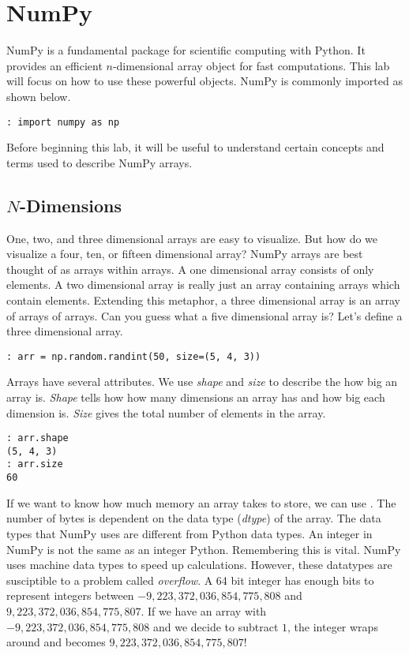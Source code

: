 \label{lab:Essentials2}


\section*{NumPy}
NumPy is a fundamental package for scientific computing with Python.  It provides an efficient $n$-dimensional array object for fast computations.  This lab will focus on how to use these powerful objects.  NumPy is commonly imported as shown below.

\begin{lstlisting}
: import numpy as np
\end{lstlisting}

Before beginning this lab, it will be useful to understand certain concepts and terms used to describe NumPy arrays.

\subsection*{$N$-Dimensions}
One, two, and three dimensional arrays are easy to visualize.  But how do we visualize a four, ten, or fifteen dimensional array?  NumPy arrays are best thought of as arrays within arrays.  A one dimensional array consists of only elements.  A two dimensional array is really just an array containing arrays which contain elements.  Extending this metaphor, a three dimensional array is an array of arrays of arrays.  Can you guess what a five dimensional array is?  Let's define a three dimensional array.

\begin{lstlisting}
: arr = np.random.randint(50, size=(5, 4, 3))
\end{lstlisting}

Arrays have several attributes.  We use \emph{shape} and \emph{size} to describe the how big an array is.  \emph{Shape} tells how how many dimensions an array has and how big each dimension is.  \emph{Size} gives the total number of elements in the array.

\begin{lstlisting}
: arr.shape
(5, 4, 3)
: arr.size
60
\end{lstlisting}

If we want to know how much memory an array takes to store, we can use .  The number of bytes is dependent on the data type (\emph{dtype}) of the array.  The data types that NumPy uses are different from Python data types.  An integer in NumPy is not the same as an integer Python.  Remembering this is vital.  NumPy uses machine data types to speed up calculations.  However, these datatypes are susciptible to a problem called \emph{overflow}.  A 64 bit integer has enough bits to represent integers between $-9,223,372,036,854,775,808$ and $9,223,372,036,854,775,807$.  If we have an array with $-9,223,372,036,854,775,808$ and we decide to subtract $1$, the integer wraps around and becomes $9,223,372,036,854,775,807$!  

